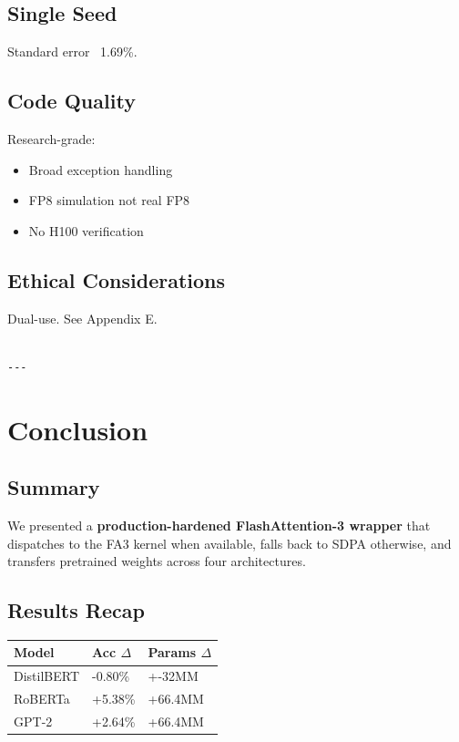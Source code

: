 \subsection{Single Seed}

Standard error ~1.69\%.

\subsection{Code Quality}

Research-grade:
\begin{itemize}
\item Broad exception handling
\item FP8 simulation not real FP8
\item No H100 verification

\end{itemize}
\subsection{Ethical Considerations}

Dual-use. See Appendix E.
\begin{lstlisting}

---
\end{lstlisting}

\section{Conclusion}

\subsection{Summary}

We presented a \textbf{production-hardened FlashAttention-3 wrapper} that 
dispatches to the FA3 kernel when available, falls back to SDPA otherwise, 
and transfers pretrained weights across four architectures.

\subsection{Results Recap}

\begin{table}[H]
\centering
\small
\begin{tabular}{lll}
\toprule
\textbf{Model} & \textbf{Acc $\Delta$} & \textbf{Params $\Delta$} \\
\midrule
DistilBERT & -0.80\% & +-32MM \\
RoBERTa & +5.38\% & +66.4MM \\
GPT-2 & +2.64\% & +66.4MM \\
\bottomrule
\end{tabular}
\end{table}


